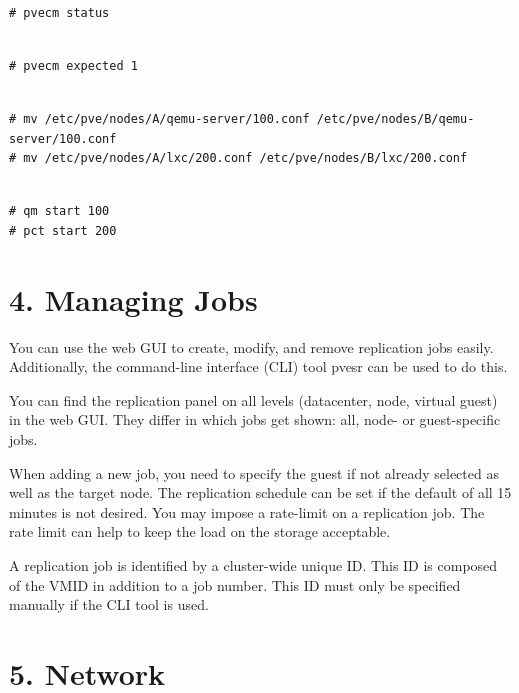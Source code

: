 \begin{lstlisting}

# pvecm status

\end{lstlisting}

\begin{lstlisting}

# pvecm expected 1

\end{lstlisting}

\begin{lstlisting}

# mv /etc/pve/nodes/A/qemu-server/100.conf /etc/pve/nodes/B/qemu-server/100.conf
# mv /etc/pve/nodes/A/lxc/200.conf /etc/pve/nodes/B/lxc/200.conf

\end{lstlisting}

\begin{lstlisting}

# qm start 100
# pct start 200

\end{lstlisting}


\section{4. Managing Jobs}

You can use the web GUI to create, modify, and remove replication jobs easily. Additionally, the command-line interface (CLI) tool pvesr can be used to do this.

You can find the replication panel on all levels (datacenter, node, virtual guest) in the web GUI. They differ in which jobs get shown: all, node- or guest-specific jobs.

When adding a new job, you need to specify the guest if not already selected as well as the target node. The replication schedule can be set if the default of all 15 minutes is not desired. You may impose a rate-limit on a replication job. The rate limit can help to keep the load on the storage acceptable.

A replication job is identified by a cluster-wide unique ID. This ID is composed of the VMID in addition to a job number. This ID must only be specified manually if the CLI tool is used.


\section{5. Network}

